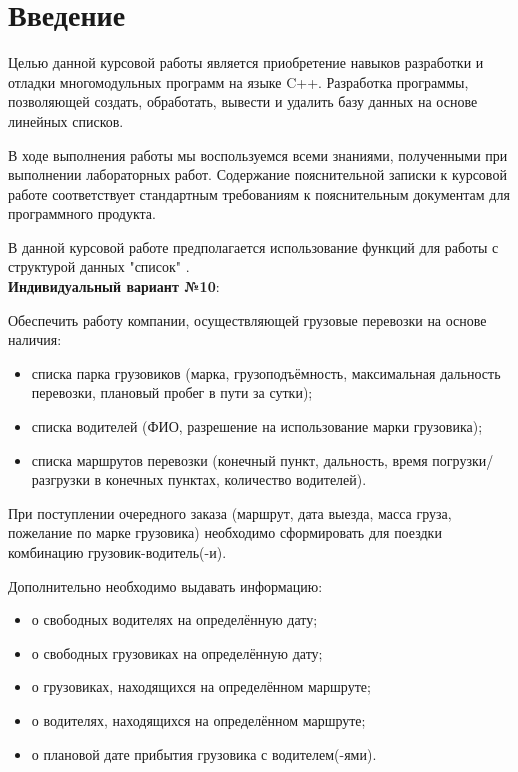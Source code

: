 \section{Введение}

Целью данной курсовой работы является приобретение навыков разработки и 
отладки многомодульных программ на языке C++. 
Разработка программы, позволяющей 
создать,
обработать, 
вывести 
и удалить 
базу данных на основе линейных списков.

В ходе выполнения работы мы воспользуемся всеми знаниями, 
полученными при выполнении лабораторных работ.
Содержание пояснительной записки к курсовой работе 
соответствует стандартным требованиям к пояснительным 
документам для программного продукта.

В данной курсовой работе предполагается использование функций для
работы с структурой данных "список" \cite{list_defenition}. \\

\textbf{Индивидуальный вариант №10}:

Обеспечить работу компании, осуществляющей грузовые
перевозки на основе наличия:

\begin{itemize}
    \item списка парка грузовиков (марка, грузоподъёмность, максимальная
    дальность перевозки, плановый пробег в пути за сутки);
    \item списка водителей (ФИО, разрешение на использование марки грузовика);
    \item списка маршрутов перевозки (конечный пункт, дальность, время
    погрузки/разгрузки в конечных пунктах, количество водителей).
\end{itemize}

При поступлении очередного заказа (маршрут, дата выезда, масса груза,
пожелание по марке грузовика) необходимо сформировать для поездки
комбинацию грузовик-водитель(-и).

Дополнительно необходимо выдавать информацию:

\begin{itemize}
    \item о свободных водителях на определённую дату;
    \item о свободных грузовиках на определённую дату;
    \item о грузовиках, находящихся на определённом маршруте;
    \item о водителях, находящихся на определённом маршруте;
    \item о плановой дате прибытия грузовика с водителем(-ями).
    
\end{itemize}
